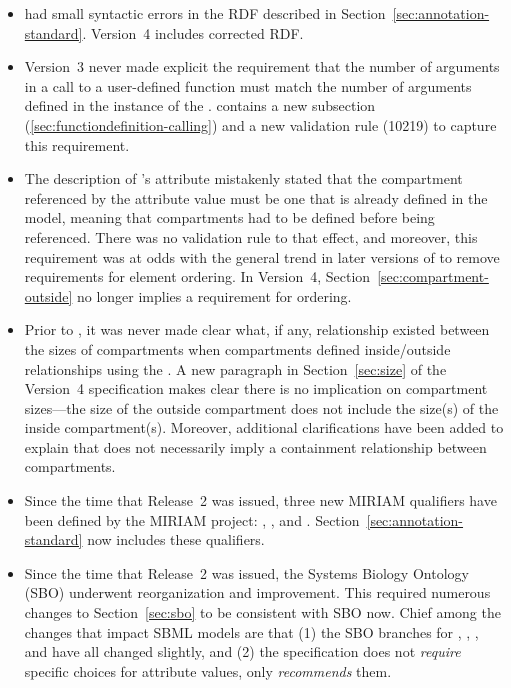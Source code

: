 \begin{blockChanged}
\begin{itemize}
\item \sbmltwothree had small syntactic errors in the RDF
  described in Section~\ref{sec:annotation-standard}.  Version~4
  includes corrected RDF.

\item Version~3 never made explicit the requirement that the
  number of arguments in a call to a user-defined function must
  match the number of arguments defined in the instance of the
  \FunctionDefinition.  \sbmltwofour contains a new subsection
  (\ref{sec:functiondefinition-calling}) and a new validation rule
  (10219) to capture this requirement.

\item The description of \Compartment's  attribute
  mistakenly stated that the compartment referenced by the
  attribute value must be one that is already defined in the
  model, meaning that compartments had to be defined before being
  referenced.  There was no validation rule to that effect, and
  moreover, this requirement was at odds with the general trend in
  later versions of \sbmltwo to remove requirements for
  element ordering.  In Version~4,
  Section~\ref{sec:compartment-outside} no longer implies a
  requirement for ordering.

\item Prior to \sbmltwofour, it was never made clear what, if any,
  relationship existed between the sizes of compartments when
  compartments defined inside/outside relationships using the
   .  A new paragraph in
  Section~\ref{sec:size} of the Version~4 specification makes
  clear there is no implication on compartment sizes---the size of
  the outside compartment does not include the size(s) of the
  inside compartment(s).  Moreover, additional clarifications have
  been added to explain that  does not necessarily
  imply a containment relationship between compartments.

\item Since the time that \sbmltwothree Release~2 was issued,
  three new MIRIAM qualifiers have been defined by the MIRIAM
  project: , , and
  .  Section~\ref{sec:annotation-standard}
  now includes these qualifiers.

\item Since the time that \sbmltwothree Release~2 was issued, the
  Systems Biology Ontology (SBO) underwent reorganization and
  improvement.  This required numerous changes to
  Section~\ref{sec:sbo} to be consistent with SBO now.  Chief
  among the changes that impact SBML models are that (1) the SBO
  branches for \Model, \CompartmentType, \SpeciesType,
  \Compartment and \Species have all changed slightly, and (2) the
  \sbmltwofour specification does not \emph{require} specific
  choices for  attribute values, only
  \emph{recommends} them.


\end{itemize}
\end{blockChanged}

